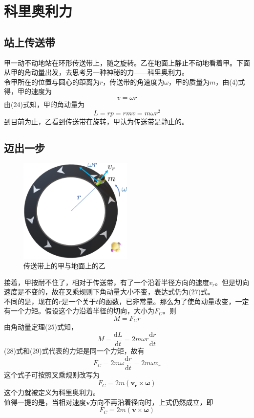 \chapter{科里奥利力}
\section{站上传送带}
甲一动不动地站在环形传送带上，随之旋转。乙在地面上静止不动地看着甲。下面从甲的角动量出发，去思考另一种神秘的力——科里奥利力。\\
令甲所在的位置与圆心的距离为$r$，传送带的角速度为$\omega$，甲的质量为$m$，由(4)式得，甲的速度为
\begin{equation}
  v=\omega r
\end{equation}
由(24)式知，甲的角动量为
\begin{equation}
  L=rp=rmv=m\omega r^2
\end{equation}
到目前为止，乙看到传送带在旋转，甲认为传送带是静止的。
\section{迈出一步}
\begin{figure}
  \centering
  \includegraphics[width=0.5\textwidth]{pic5.png}
  \caption{传送带上的甲与地面上的乙}\label{5}
\end{figure}
接着，甲按耐不住了，相对于传送带，有了一个沿着半径方向的速度$v_r$。但是切向速度是不变的，故在叉乘规则下角动量大小不变，表达式仍为(27)式。\\
不同的是，现在的$r$是一个关于$t$的函数，已非常量。那么为了使角动量改变，一定有一个力矩。假设这个力沿着半径的切向，大小为$F_C$。则
\begin{equation}
  M=F_Cr
\end{equation}
由角动量定理(25)式知，
\begin{equation}
  M=\frac{\textrm{d}L}{\textrm{d}t}=2m\omega r \frac{\textrm{d}r}{\textrm{d}t}
\end{equation}
(28)式和(29)式代表的力矩是同一个力矩，故有
\begin{equation}
  F_C=2m\omega \frac{\textrm{d}r}{\textrm{d}t}=2m\omega v_r
\end{equation}
这个式子可按照叉乘规则改写为
\begin{equation}
  F_C=2m(\bm{v_r}\times \bm{\omega} )
\end{equation}
这个力就被定义为科里奥利力。\\
值得一提的是，当相对速度$\bm{v}$方向不再沿着径向时，上式仍然成立，即
\begin{equation}
  F_C=2m(\bm{v}\times \bm{\omega} )
\end{equation}
